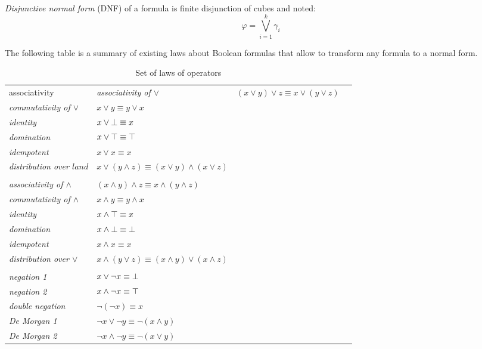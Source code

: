 \emph{Disjunctive normal form} (DNF) of a formula is finite disjunction of cubes and noted:
  $$\varphi = \bigvee_{i=1}^k \gamma_i$$

The following table is a summary of existing laws about Boolean formulas that allow to transform any formula to
a normal form.

\begin{table}[!htbp]
	\centering
	\begin{tabular}{lllc}
		
		associativity & 
		
		
		\emph{associativity of $\lor$} & $(x \lor y) \lor z \equiv x \lor (y \lor z)$\\
		\emph{commutativity of $\lor$} & $x \lor y \equiv y \lor x$\\
		\emph{identity} & $x \lor \bot \equiv x$\\
		\emph{domination} & $x \lor \top \equiv \top$\\
		\emph{idempotent} & $x \lor x \equiv x$\\
		\emph{distribution over $land$} & $x \lor (y \land z) \equiv (x \lor y) \land (x \lor z)$\\
		
		\\
		\emph{associativity of $\land$} & $(x \land y) \land z \equiv x \land (y \land z)$\\
		\emph{commutativity of $\land$} & $x \land y \equiv y \land x$\\
		\emph{identity} & $x \land \top \equiv x$\\
		\emph{domination} & $x \land \bot \equiv \bot$\\
		\emph{idempotent} & $x \land x \equiv x$\\
		\emph{distribution over $\lor$} & $x \land (y \lor z) \equiv (x \land y) \lor (x \land z)$\\
 		\\
 		\emph{negation 1} & $x \lor \neg x \equiv \bot$\\
  		\emph{negation 2} & $x \land \neg x \equiv \top$\\
  		
  		\emph{double negation} & $\neg (\neg x) \equiv x$ \\
  		\emph{De Morgan 1} & $\neg x \lor \neg y \equiv \neg (x \land y)$\\
  		\emph{De Morgan 2} & $\neg x \land \neg y \equiv \neg (x \lor y)$\\
  		
	\end{tabular}
	\caption{Set of laws of operators}
	\label{tab:laws}
\end{table}


